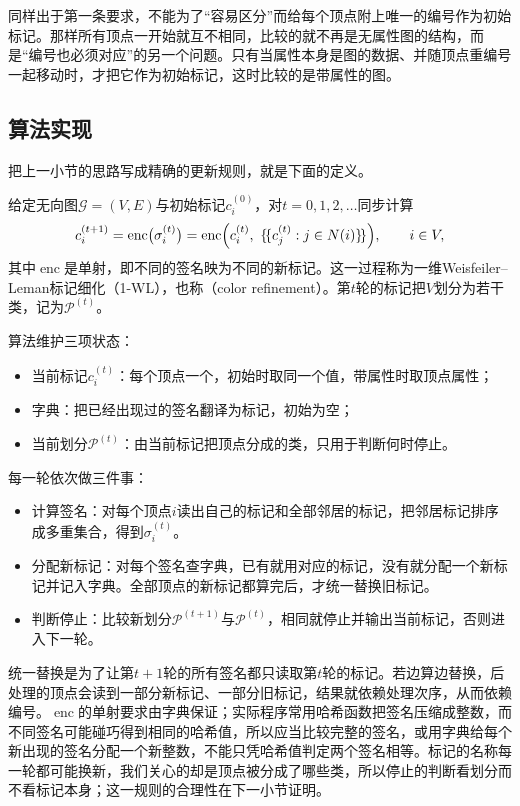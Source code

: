 同样出于第一条要求，不能为了“容易区分”而给每个顶点附上唯一的编号作为初始标记。那样所有顶点一开始就互不相同，比较的就不再是无属性图的结构，而是“编号也必须对应”的另一个问题。只有当属性本身是图的数据、并随顶点重编号一起移动时，才把它作为初始标记，这时比较的是带属性的图。

\subsection{算法实现}
\label{sec:graph-trav-wl-algorithm}

把上一小节的思路写成精确的更新规则，就是下面的定义。

\begin{definition}[1-WL标记细化]
\label{def:graph-trav-wl-refinement}
给定无向图$\mathcal G=(V,E)$与初始标记$c_i^{(0)}$，对$t=0,1,2,\ldots$同步计算
\begin{equation}
c_i^{(t+1)}=\operatorname{enc}\bigl(\sigma_i^{(t)}\bigr)
=\operatorname{enc}\Bigl(c_i^{(t)},\ \{\!\{c_j^{(t)}:j\in N(i)\}\!\}\Bigr),
\qquad i\in V,
\label{eq:graph-trav-wl-update}
\end{equation}
其中$\operatorname{enc}$是单射，即不同的签名映为不同的新标记。这一过程称为一维Weisfeiler--Leman标记细化（1-WL），也称（color refinement）。第$t$轮的标记把$V$划分为若干类，记为$\mathcal P^{(t)}$。
\end{definition}

算法维护三项状态：
\begin{itemize}
  \item 当前标记$c_i^{(t)}$：每个顶点一个，初始时取同一个值，带属性时取顶点属性；
  \item 字典：把已经出现过的签名翻译为标记，初始为空；
  \item 当前划分$\mathcal P^{(t)}$：由当前标记把顶点分成的类，只用于判断何时停止。
\end{itemize}
每一轮依次做三件事：
\begin{itemize}
  \item 计算签名：对每个顶点$i$读出自己的标记和全部邻居的标记，把邻居标记排序成多重集合，得到$\sigma_i^{(t)}$。
  \item 分配新标记：对每个签名查字典，已有就用对应的标记，没有就分配一个新标记并记入字典。全部顶点的新标记都算完后，才统一替换旧标记。
  \item 判断停止：比较新划分$\mathcal P^{(t+1)}$与$\mathcal P^{(t)}$，相同就停止并输出当前标记，否则进入下一轮。
\end{itemize}

统一替换是为了让第$t+1$轮的所有签名都只读取第$t$轮的标记。若边算边替换，后处理的顶点会读到一部分新标记、一部分旧标记，结果就依赖处理次序，从而依赖编号。$\operatorname{enc}$的单射要求由字典保证；实际程序常用哈希函数把签名压缩成整数，而不同签名可能碰巧得到相同的哈希值，所以应当比较完整的签名，或用字典给每个新出现的签名分配一个新整数，不能只凭哈希值判定两个签名相等。标记的名称每一轮都可能换新，我们关心的却是顶点被分成了哪些类，所以停止的判断看划分而不看标记本身；这一规则的合理性在下一小节证明。

